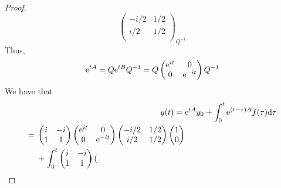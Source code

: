 \documentclass[../psets.tex]{subfiles}
\begin{document}
\begin{enumerate}
\begin{proof}
\begin{equation*}
{\begin{pmatrix}
                    -i/2 & 1/2\\
                    i/2 & 1/2\\
                \end{pmatrix}
            }_{Q^{-1}}
        \end{equation*}
        Thus,
        \begin{equation*}
            \e[tA] = Q\e[tB]Q^{-1}
            = Q
            \begin{pmatrix}
                \e[it] & 0\\
                0 & \e[-it]\\
            \end{pmatrix}
            Q^{-1}
        \end{equation*}
        We have that
        \begin{align*}
            y(t) ={}& \e[tA]y_0+\int_0^t\e[(t-\tau)A]f(\tau)\dd\tau\\
            \begin{split}
                ={}&
                \begin{pmatrix}
                    i & -i\\
                    1 & 1\\
                \end{pmatrix}
                \begin{pmatrix}
                    \e[it] & 0\\
                    0 & \e[-it]\\
                \end{pmatrix}
                \begin{pmatrix}
                    -i/2 & 1/2\\
                    i/2 & 1/2\\
                \end{pmatrix}
                \begin{pmatrix}
                    1\\
                    0\\
                \end{pmatrix}\\
                &+\int_0^t
                \begin{pmatrix}
                    i & -i\\
                    1 & 1\\
                \end{pmatrix}
                \begin{pmatrix}

\end{pmatrix}
\end{split}
\end{align*}
\end{proof}
\end{enumerate}
\end{document}
